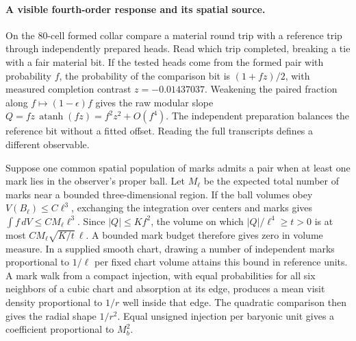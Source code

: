 \documentclass[11pt]{article}
\begin{document}
\paragraph{A visible fourth-order response and its spatial source.}\label{par:visible-quartic-source}
On the 80-cell formed collar compare a material round trip with a
reference trip through independently prepared heads. Read which trip
completed, breaking a tie with a fair material bit. If the tested
heads come from the formed pair with probability $f$, the probability
of the comparison bit is $(1+fz)/2$, with measured completion contrast
$z=-0.01437037$. Weakening the paired fraction along
$f\mapsto(1-\epsilon)f$ gives the raw modular slope
$Q=fz\,\operatorname{atanh}(fz)=f^2z^2+O(f^4)$.
The independent preparation balances the reference bit without a fitted
offset. Reading the full transcripts defines a different observable.

Suppose one common spatial population of marks admits a pair when at
least one mark lies in the observer's proper ball. Let $M_\ell$ be
the expected total number of marks near a bounded three-dimensional
region. If the ball volumes obey $V(B_\ell)\le C\ell^3$, exchanging
the integration over centers and marks gives $\int f\,dV\le CM_\ell\ell^3$.
Since $|Q|\le Kf^2$, the volume on which
$|Q|/\ell^4\ge t>0$ is at most $CM_\ell\sqrt{K/t}\,\ell$.
A bounded mark budget therefore gives zero in volume measure. In a
supplied smooth chart, drawing a number of independent marks proportional
to $1/\ell$ per fixed chart volume attains this bound in reference units. A mark
walk from a compact injection, with equal probabilities for all six
neighbors of a cubic chart and absorption at its edge, produces a
mean visit density proportional to $1/r$ well inside that edge.
The quadratic comparison then gives the radial shape $1/r^2$.
Equal unsigned injection per baryonic unit gives a coefficient
proportional to $M_b^2$.
\end{document}
